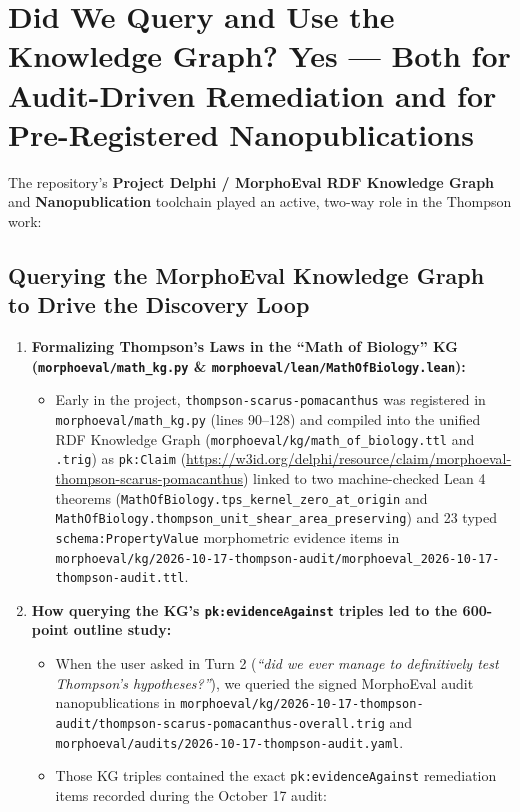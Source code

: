 \documentclass[10.5pt,a4paper]{article}
\newcommand{\code}[1]{{\footnotesize\nolinkurl{#1}}}
\begin{document}
\section{Did We Query and Use the Knowledge Graph? Yes --- Both for Audit-Driven Remediation and for Pre-Registered Nanopublications}

The repository's \textbf{Project Delphi / MorphoEval RDF Knowledge Graph} and \textbf{Nanopublication} toolchain played an active, two-way role in the Thompson work:

\subsection{Querying the MorphoEval Knowledge Graph to Drive the Discovery Loop}

\begin{enumerate}
  \setlength{\itemsep}{4pt}
  \item \textbf{Formalizing Thompson's Laws in the ``Math of Biology'' KG (\code{morphoeval/math_kg.py} \& \code{morphoeval/lean/MathOfBiology.lean}):}
  \begin{itemize}
    \setlength{\itemsep}{2pt}
    \item Early in the project, \code{thompson-scarus-pomacanthus} was registered in \code{morphoeval/math_kg.py} (lines 90--128) and compiled into the unified RDF Knowledge Graph (\code{morphoeval/kg/math_of_biology.ttl} and \texttt{.trig}) as \texttt{pk:Claim} (\url{https://w3id.org/delphi/resource/claim/morphoeval-thompson-scarus-pomacanthus}) linked to two machine-checked Lean 4 theorems (\code{MathOfBiology.tps_kernel_zero_at_origin} and \code{MathOfBiology.thompson_unit_shear_area_preserving}) and 23 typed \texttt{schema:PropertyValue} morphometric evidence items in \code{morphoeval/kg/2026-10-17-thompson-audit/morphoeval_2026-10-17-thompson-audit.ttl}.
  \end{itemize}
  \item \textbf{How querying the KG's \texttt{pk:evidenceAgainst} triples led to the 600-point outline study:}
  \begin{itemize}
    \setlength{\itemsep}{2pt}
    \item When the user asked in Turn 2 (\emph{``did we ever manage to definitively test Thompson's hypotheses?''}), we queried the signed MorphoEval audit nanopublications in \code{morphoeval/kg/2026-10-17-thompson-audit/thompson-scarus-pomacanthus-overall.trig} and \code{morphoeval/audits/2026-10-17-thompson-audit.yaml}.
    \item Those KG triples contained the exact \texttt{pk:evidenceAgainst} remediation items recorded during the October 17 audit:

\end{itemize}
\end{enumerate}
\end{document}
